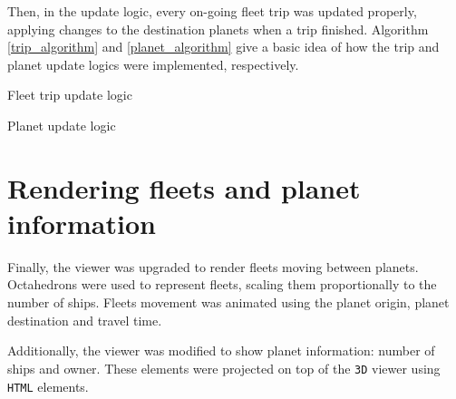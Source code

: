 \documentclass[a4paper,11pt,titlepage,abstract,numbers=noenddot,automark,mnsy,intlimits,rgb,dvipsnames]{report}
\begin{document}
Then, in the update logic, every on-going fleet trip was updated properly, applying changes to the destination planets
when a trip finished. Algorithm \autoref{trip_algorithm} and \autoref{planet_algorithm} give a basic idea of how the trip and planet
update logics were implemented, respectively.
\begin{algorithm}[H]
\caption{Fleet trip update logic}
\label{trip_algorithm}
\begin{algorithmic}
\ENDIF
\ENDFOR
\end{algorithmic}
\end{algorithm}
\begin{algorithm}[H]
\caption{Planet update logic}
\label{planet_algorithm}
\begin{algorithmic}
\ENDIF
{}
\ELSE
{}
\ELSE
{}
\ENDIF
\ENDIF
\end{algorithmic}
\end{algorithm}
\section{Rendering fleets and planet information}
Finally, the viewer was upgraded to render fleets moving between planets. Octahedrons were used to represent
fleets, scaling them proportionally to the number of ships. Fleets movement was animated using the planet origin,
planet destination and travel time.

Additionally, the viewer was modified to show planet information: number of ships and owner. These elements were
projected on top of the \texttt{3D} viewer using \texttt{HTML} elements.
\end{document}
